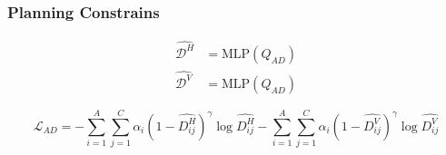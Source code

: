 \subsubsection{Planning Constrains}
\label{sec:planning_constrains}
\begin{align}
    \hat{\mathcal{D}^H} &= \textrm{MLP}(Q_{AD}) \\
     \hat{\mathcal{D}^V} &= \textrm{MLP}(Q_{AD})
\end{align}

\begin{equation}
    \mathcal{L}_{AD} = - \sum_{i=1}^A\sum_{j=1}^C\alpha_i(1-\hat{D^H_{ij}})^\gamma \log \hat{D^H_{ij}} - \sum_{i=1}^A\sum_{j=1}^C\alpha_i(1-\hat{D^V_{ij}})^\gamma \log \hat{D^V_{ij}}
\end{equation}


